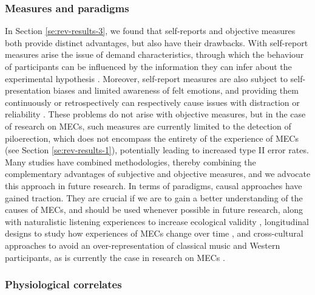 \subsubsection{Measures and paradigms}

In Section \ref{se:rev-results-3}, we found that self-reports and objective measures both provide distinct advantages, but also have their drawbacks. With self-report measures arise the issue of demand characteristics, through which the behaviour of participants can be influenced by the information they can infer about the experimental hypothesis \parencite{juslin2016, orne1962}. Moreover, self-report measures are also subject to self-presentation biases and limited awareness of felt emotions, and providing them continuously or retrospectively can respectively cause issues with distraction or reliability \parencite{zentner2010}. These problems do not arise with objective measures, but in the case of research on MECs, such measures are currently limited to the detection of piloerection, which does not encompass the entirety of the experience of MECs (see Section \ref{se:rev-results-1}), potentially leading to increased type II error rates. Many studies have combined methodologies, thereby combining the complementary advantages of subjective and objective measures, and we advocate this approach in future research. In terms of paradigms, causal approaches have gained traction. They are crucial if we are to gain a better understanding of the causes of MECs, and should be used whenever possible in future research, along with naturalistic listening experiences to increase ecological validity \parencite[see][]{chabin2020, eerola2018, hargreaves2010, hodges2016}, longitudinal designs to study how experiences of MECs change over time \parencite[see][]{greasley2016}, and cross-cultural approaches to avoid an over-representation of classical music and Western participants, as is currently the case in research on MECs \parencite[see][]{harrison2014}.

\subsubsection{Physiological correlates}

